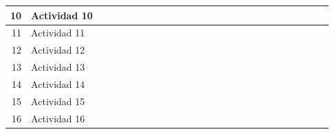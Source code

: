 \documentclass[10pt,letterpaper]{report}
\begin{document}
\begin{landscape}
\begin{table}[htbp]
{\begin{tabular}{|r|l|r|r|r|r|r|r|r|r|r|r|r|r|r|r|r|r|r|r|r|r|r|r|r|r|}
			\midrule
			10    & Actividad 10 &       &       &       &       &       & \cellcolor[rgb]{ .557,  .663,  .859} & \cellcolor[rgb]{ .557,  .663,  .859} & \cellcolor[rgb]{ .557,  .663,  .859} & \cellcolor[rgb]{ .557,  .663,  .859} &       &       &       &       &       &       &       &       &       &       &       &       &       &       &  \\
			\midrule
			11    & Actividad 11 &       &       &       &       &       &       &       &       &       &       & \cellcolor[rgb]{ .557,  .663,  .859} & \cellcolor[rgb]{ .557,  .663,  .859} & \cellcolor[rgb]{ .557,  .663,  .859} & \cellcolor[rgb]{ .557,  .663,  .859} &       &       &       &       &       &       &       &       &       &  \\
			\midrule
			12    & Actividad 12 &       &       &       &       &       &       &       &       &       &       &       &       &       &       &       &       &       &       &       &       &       &       &       &  \\
			\midrule
			13    & Actividad 13 &       &       &       &       &       &       &       &       &       &       &       &       &       &       & \cellcolor[rgb]{ .557,  .663,  .859} & \cellcolor[rgb]{ .557,  .663,  .859} & \cellcolor[rgb]{ .557,  .663,  .859} & \cellcolor[rgb]{ .557,  .663,  .859} & \cellcolor[rgb]{ .557,  .663,  .859} &       &       &       &       &  \\
			\midrule
			14    & Actividad 14 &       &       &       &       &       &       &       &       &       &       &       &       &       &       &       &       &       &       &       & \cellcolor[rgb]{ .557,  .663,  .859} & \cellcolor[rgb]{ .557,  .663,  .859} & \cellcolor[rgb]{ .557,  .663,  .859} & \cellcolor[rgb]{ .557,  .663,  .859} &  \\
			\midrule
			15    & Actividad 15 &       &       &       &       &       &       &       &       &       &       &       &       &       &       &       &       &       &       &       &       &       & \cellcolor[rgb]{ .557,  .663,  .859} & \cellcolor[rgb]{ .557,  .663,  .859} & \cellcolor[rgb]{ .557,  .663,  .859} \\
			\midrule
			16    & Actividad 16 &       &       &       &       &       &       &       &       &       &       &       &       &       &       &       &       &       &       &       &       &       & \cellcolor[rgb]{ .557,  .663,  .859} & \cellcolor[rgb]{ .557,  .663,  .859} & \cellcolor[rgb]{ .557,  .663,  .859} \\
			\bottomrule

\end{tabular}}
\end{table}
\end{landscape}
\end{document}
